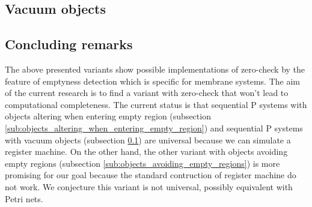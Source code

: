 
\subsection{Vacuum objects} %
\label{sub:vacuum_objects}


\subsection{Concluding remarks} %
\label{sub:concluding_remarks_of_emptyness_detection}

The above presented variants show possible implementations of zero-check by the feature of emptyness detection which is specific for membrane systems. The aim of the current research is to find a variant with zero-check that won't lead to computational completeness. The current status is that sequential P systems with objects altering when entering empty region (subsection \ref{sub:objects_altering_when_entering_empty_region}) and sequential P systems with vacuum objects (subsection \ref{sub:vacuum_objects}) are universal because we can simulate a register machine. On the other hand, the other variant with objects avoiding empty regions (subsection \ref{sub:objects_avoiding_empty_regions}) is more promising for our goal because the standard contruction of register machine do not work. We conjecture this variant is not universal, possibly equivalent with Petri nets.

